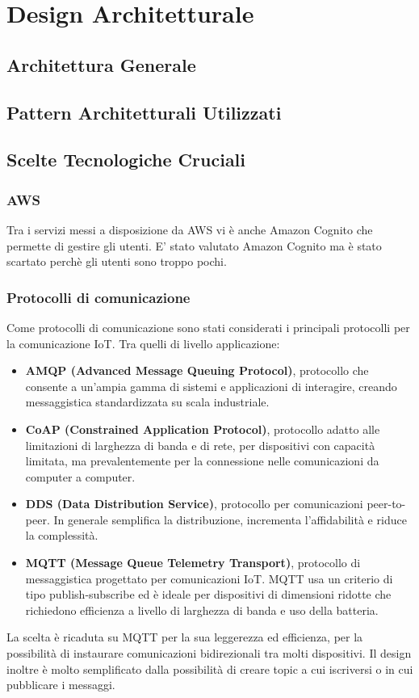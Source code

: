\chapter{Design Architetturale}
    \section{Architettura Generale}
    
    \section{Pattern Architetturali Utilizzati}
    
    \section{Scelte Tecnologiche Cruciali}
        \subsection{AWS}
        Tra i servizi messi a disposizione da AWS vi è anche Amazon Cognito che permette di gestire gli utenti. 
        E' stato valutato Amazon Cognito ma è stato scartato perchè gli utenti sono troppo pochi.
        
        \subsection{Protocolli di comunicazione}
        Come protocolli di comunicazione sono stati considerati i principali protocolli per la comunicazione IoT. Tra quelli di livello applicazione: 
        \begin{itemize}
            \item \textbf{AMQP (Advanced Message Queuing Protocol)}, protocollo che consente a un'ampia gamma di sistemi e applicazioni di interagire, creando messaggistica standardizzata su scala industriale.
            \item \textbf{CoAP (Constrained Application Protocol)}, protocollo adatto alle limitazioni di larghezza di banda e di rete, per dispositivi con capacità limitata, ma prevalentemente per la connessione nelle comunicazioni da computer a computer. 
            \item \textbf{DDS (Data Distribution Service)}, protocollo per comunicazioni peer-to-peer. In generale semplifica la distribuzione, incrementa l'affidabilità e riduce la complessità.
            \item \textbf{MQTT (Message Queue Telemetry Transport)}, protocollo di messaggistica progettato per comunicazioni IoT. MQTT usa un criterio di tipo publish-subscribe ed è ideale per dispositivi di dimensioni ridotte che richiedono efficienza a livello di larghezza di banda e uso della batteria.
        \end{itemize}
        La scelta è ricaduta su MQTT per la sua leggerezza ed efficienza, per la possibilità di instaurare comunicazioni bidirezionali tra molti dispositivi. Il design inoltre è molto semplificato dalla possibilità di creare topic a cui iscriversi o in cui pubblicare i messaggi.
        
